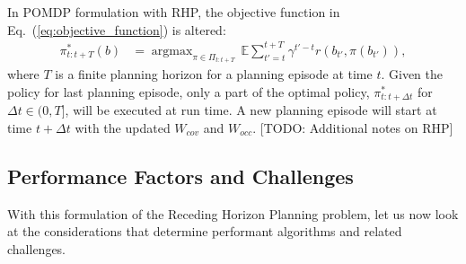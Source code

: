 \documentclass[letterpaper]{article} %
\newcommand{\phdone}[1]{} %
\newcommand{\argmax}{\mathop{\mathrm{argmax}}}
\begin{document}
\phdone{RHP Objective Function}
In POMDP formulation with RHP, the objective function in Eq.~(\ref{eq:objective_function}) is altered:
\begin{align}
  \pi_{t:t+T}^*(b) &= \argmax_{\pi \in \Pi_{t:t+T}} \, \mathbb{E} \sum_{t'=t}^{t+T} \gamma^{t'-t} r(b_{t'}, \pi(b_{t'})),
  \label{eq:receding_objective_function}
\end{align}
where $T$ is a finite planning horizon for a planning episode at time $t$.
Given the policy for last planning episode, only a part of the optimal policy, $\pi^*_{t:t+\Delta t}$ for $\Delta t \in (0, T]$, will be executed at run time. A new planning episode will start at time $t+\Delta t$ with the updated $W_{cov}$ and $W_{occ}$.
[TODO: Additional notes on RHP]







\subsection{Performance Factors and Challenges} \label{ssec:challenges}
With this formulation of the Receding Horizon Planning problem, let us now look at the considerations that determine performant algorithms and related challenges.
\end{document}
